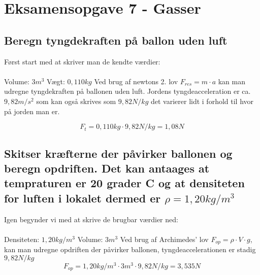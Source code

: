 \newpage
\section{Eksamensopgave 7 - Gasser}
\subsection{Beregn tyngdekraften på ballon uden luft}
Først start med at skriver man de kendte værdier:
\\\\
Volume: \begin{math}3m^3\end{math} \newline
Vægt: \begin{math}0,110kg\end{math} \newline
Ved brug af newtons 2. lov \begin{math}F_{res}=m\cdot a\end{math} kan man udregne tyngdekraften på ballonen uden luft. \newline
Jordens tyngdeacceleration er ca. \begin{math}9,82 m/s^2\end{math} som kan også skrives som \begin{math}9,82N/kg\end{math} det varierer lidt i forhold til hvor på jorden man er. \newline

\begin{equation}
	F_t=0,110kg\cdot9,82 N/kg=1,08N
\end{equation}
\subsection{Skitser kræfterne der påvirker ballonen og beregn opdriften. Det kan antaages at tempraturen er 20 grader C og at densiteten for luften i lokalet dermed er \begin{math}\rho=1,20kg/m^3\end{math}}
Igen begynder vi med at skrive de brugbar værdier ned:
\\\\
Densiteten: \begin{math}1,20kg/m^3\end{math} \newline
Volume: \begin{math}3m^3\end{math} \newline
Ved brug af Archimedes' lov \begin{math}F_{op}=\rho\cdot V\cdot g\end{math}, kan man udregne opdriften der påvirker ballonen, tyngdeaccelerationen er stadig \begin{math}9,82 N/kg\end{math}
\begin{equation}
	F_{op}=1,20kg/m^3 \cdot 3m^3 \cdot 9,82N/kg=3,535N
\end{equation}

